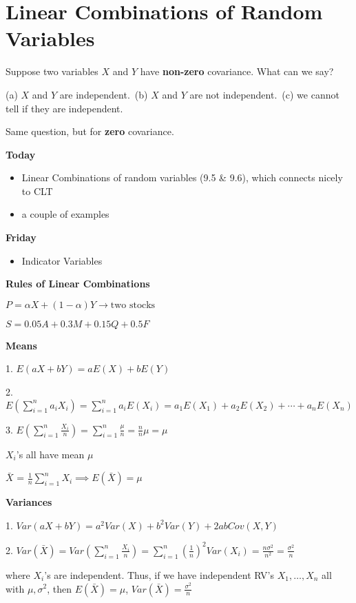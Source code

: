 \section{Linear Combinations of Random Variables}
Suppose two variables $ X $ and $ Y $ have \textbf{non-zero} covariance.
What can we say?

(a) $ X $ and $ Y $ are independent.\ (b) $ X $ and $ Y $ are not independent.\
(c) we cannot tell if they are independent.

Same question, but for \textbf{zero} covariance.

\textbf{Today}
\begin{itemize}
    \item Linear Combinations of random variables
          (9.5 \& 9.6), which connects nicely to CLT
    \item a couple of examples
\end{itemize}

\textbf{Friday}
\begin{itemize}
    \item Indicator Variables
\end{itemize}

\textbf{Rules of Linear Combinations}

$ P=\alpha X+(1-\alpha)Y\rightarrow\text{two stocks} $

$ S=0.05A+0.3M+0.15Q+0.5F $

\textbf{Means}

1. $ E(aX+bY)=aE(X)+bE(Y) $

2. $ E\left(\sum\limits_{i=1}^{n} a_i X_i\right)=\sum\limits_{i=1}^{n}a_i E(X_i)=
    a_1E(X_1)+a_2E(X_2)+\cdots +a_n E(X_n) $

3. $ E\left(\sum\limits_{i=1}^{n} \frac{X_i}{n}\right)=\sum\limits_{i=1}^{n}\frac{\mu}{n}=\frac{n}{n} \mu=\mu $

$ X_i $'s all have mean $ \mu $

$ \bar{X} $ = $ \frac{1}{n} \sum\limits_{i=1}^{n} X_i\implies E(\bar{X})=\mu $

\textbf{Variances}

1. $ Var(aX+bY)=a^2Var(X)+b^2Var(Y)+2abCov(X,Y) $

2. $ Var(\bar{X})=Var\left(\sum\limits_{i=1}^{n} \frac{X_i}{n}\right)=\sum\limits_{i=1}^{n}\left( \frac{1}{n}  \right)^2
    Var(X_i)=\frac{n\sigma^2}{n^2}=\frac{\sigma^2}{n} $

where $ X_i $'s are independent. Thus, if we have independent RV's
$ X_1,\ldots,X_n $ all with $ \mu,\sigma^2 $, then $ E(\bar{X})=\mu $,
$ Var(\bar{X})=\frac{\sigma^2}{n} $

